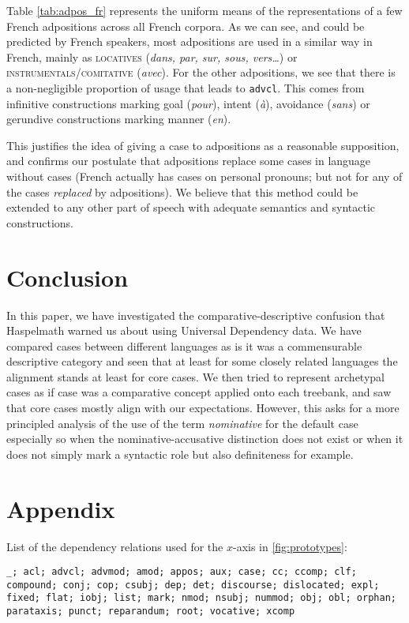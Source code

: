 \documentclass[11pt]{article}
\begin{document}
Table \ref{tab:adpos_fr} represents the uniform means of the representations of a few French adpositions across all French corpora. 
As we can see, and could be predicted by French speakers, most adpositions are used in a similar way in French, mainly as \textsc{locatives} (\textsl{dans, par, sur, sous, vers\ldots}) or \textsc{instrumentals/comitative} (\textsl{avec}). 
For the other adpositions, we see that there is a non-negligible proportion of usage that leads to \texttt{advcl}. 
This comes from infinitive constructions marking goal (\textsl{pour}), intent (\textsl{à}), avoidance (\textsl{sans}) or gerundive constructions marking manner (\textsl{en}).%

This justifies the idea of giving a case to adpositions as a reasonable supposition, and confirms our postulate that adpositions replace some cases in language without cases (French actually has cases on personal pronouns; but not for any of the cases \textit{replaced} by adpositions). 
We believe that this method could be extended to any other part of speech with adequate semantics and syntactic constructions. 


\section{Conclusion}

In this paper, we have investigated the comparative-descriptive confusion that Haspelmath warned us about using Universal Dependency data.
We have compared cases between different languages as is it was a commensurable descriptive category and seen that at least for some closely related languages the alignment stands at least for core cases.
We then tried to represent archetypal cases as if case was a comparative concept applied onto each treebank, and saw that core cases mostly align with our expectations.
However, this asks for a more principled analysis of the use of the term \textit{nominative} for the default case especially so when the nominative-accusative distinction does not exist or when it does not simply mark a syntactic role but also definiteness for example.








\section*{Appendix}

List of the dependency relations used for the $x$-axis in \ref{fig:prototypes}:

\texttt{\_; acl; advcl; advmod; amod; appos; aux; case; cc; ccomp; clf; compound; conj; cop; csubj; dep; det; discourse; dislocated; expl; fixed; flat; iobj; list; mark; nmod; nsubj; nummod; obj; obl; orphan; parataxis; punct; reparandum; root; vocative; xcomp}
\end{document}

